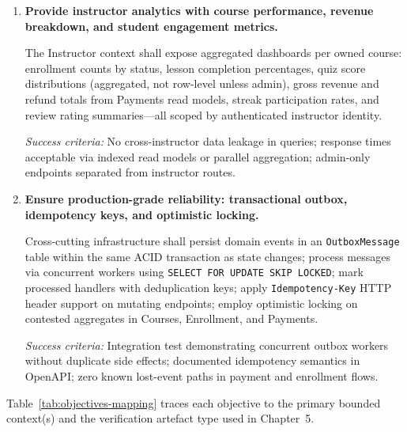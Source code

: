 \begin{enumerate}
  \textit{Success criteria:} Students cannot view unmoderated posts from peers where policy requires acceptance; instructors notified within outbox-driven pipeline; spam rate limits applied; audit trail for moderation decisions.

  \item \textbf{Provide instructor analytics with course performance, revenue breakdown, and student engagement metrics.}

  The Instructor context shall expose aggregated dashboards per owned course: enrollment counts by status, lesson completion percentages, quiz score distributions (aggregated, not row-level unless admin), gross revenue and refund totals from Payments read models, streak participation rates, and review rating summaries---all scoped by authenticated instructor identity.

  \textit{Success criteria:} No cross-instructor data leakage in queries; response times acceptable via indexed read models or parallel aggregation; admin-only endpoints separated from instructor routes.

  \item \textbf{Ensure production-grade reliability: transactional outbox, idempotency keys, and optimistic locking.}

  Cross-cutting infrastructure shall persist domain events in an \texttt{OutboxMessage} table within the same ACID transaction as state changes; process messages via concurrent workers using \texttt{SELECT FOR UPDATE SKIP LOCKED}; mark processed handlers with deduplication keys; apply \texttt{Idempotency-Key} HTTP header support on mutating endpoints; employ optimistic locking on contested aggregates in Courses, Enrollment, and Payments.

  \textit{Success criteria:} Integration test demonstrating concurrent outbox workers without duplicate side effects; documented idempotency semantics in OpenAPI; zero known lost-event paths in payment and enrollment flows.
\end{enumerate}

Table~\ref{tab:objectives-mapping} traces each objective to the primary bounded context(s) and the verification artefact type used in Chapter~5.

